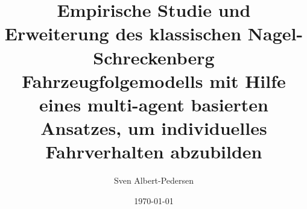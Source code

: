 \documentclass{tucplain}
\title{\textbf{Empirische Studie und Erweiterung des klassischen Nagel-Schreckenberg Fahrzeugfolgemodells mit Hilfe eines multi-agent basierten Ansatzes, um individuelles Fahrverhalten abzubilden}}
\author{Sven Albert-Pedersen}
\date{\today}
\begin{document}
    \let\ref\cref
    
    
    \listoftodos
    
    
    
    
%    
%    
     
%    
    
	
	
    

    
\end{document}
